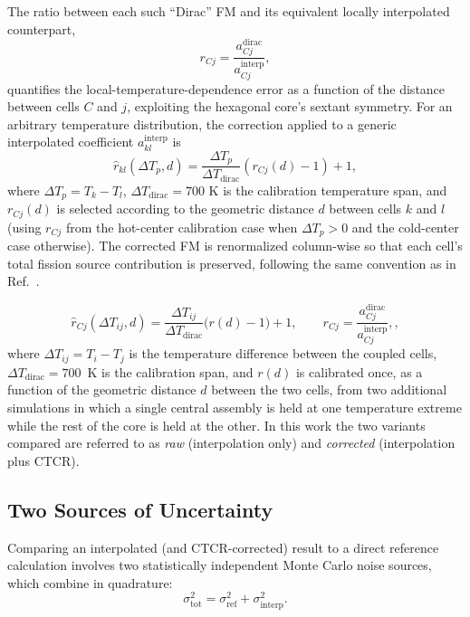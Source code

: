 \documentclass{style/nseJournal}
\begin{document}
The ratio between each such ``Dirac'' FM and its equivalent locally interpolated counterpart,
\begin{equation}
  r_{Cj} = \frac{a^{\text{dirac}}_{Cj}}{a^{\text{interp}}_{Cj}},
  \label{eqn:ratio_def}
\end{equation}
%
quantifies the local-temperature-dependence error as a function of the distance between cells $C$ and $j$, exploiting the hexagonal core's sextant symmetry. For an arbitrary temperature distribution, the correction applied to a generic interpolated coefficient $a^{\text{interp}}_{kl}$ is
%
\begin{equation}
  \hat r_{kl}(\Delta T_p, d) = \frac{\Delta T_p}{\Delta T_{\text{dirac}}} \left( r_{Cj}(d) - 1 \right) + 1,
  \label{eqn:ratio_apply}
\end{equation}
%
where $\Delta T_p = T_k - T_l$, $\Delta T_{\text{dirac}} = 700$ K is the calibration temperature span, and $r_{Cj}(d)$ is selected according to the geometric distance $d$ between cells $k$ and $l$ (using $r_{Cj}$ from the hot-center calibration case when $\Delta T_p > 0$ and the cold-center case otherwise). The corrected FM is renormalized column-wise so that each cell's total fission source contribution is preserved, following the same convention as in Ref.~\cite{VitaPHYSOR2026}.

\begin{equation}
  \hat r_{Cj}(\Delta T_{ij}, d) = \frac{\Delta T_{ij}}{\Delta T_{\text{dirac}}}\big(r(d) - 1\big) + 1,
  \qquad
    r_{Cj} = \frac{a^{\text{dirac}}_{Cj}}{a^{\text{interp}}_{Cj}},
,
  \label{eqn:ctcr}
\end{equation}
%
where $\Delta T_{ij}=T_i-T_j$ is the temperature difference between the coupled cells, $\Delta T_{\text{dirac}}=700$~K is the calibration span, and $r(d)$ is calibrated once, as a function of the geometric distance $d$ between the two cells, from two additional simulations in which a single central assembly is held at one temperature extreme while the rest of the core is held at the other. 
In this work the two variants compared are referred to as \emph{raw} (interpolation only) and \emph{corrected} (interpolation plus CTCR).


\subsection{Two Sources of Uncertainty}
\label{sec:uncertainty}

Comparing an interpolated (and CTCR-corrected) result to a direct reference calculation involves two statistically independent Monte Carlo noise sources, which combine in quadrature:
\begin{equation}
  \sigma_{\text{tot}}^2 = \sigma_{\text{ref}}^2 + \sigma_{\text{interp}}^2 .
  \label{eqn:sigma_tot}
\end{equation}
\end{document}
